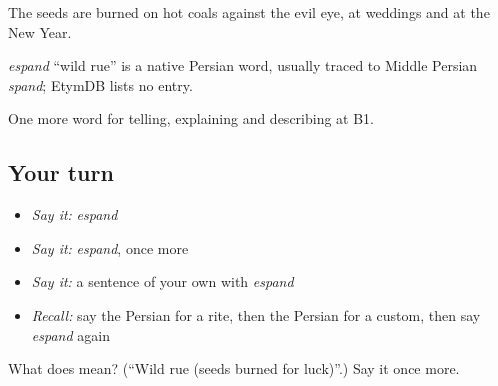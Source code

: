 The seeds are burned on hot coals against the evil eye, at weddings and at the New Year.

\begin{cousinweb}
\emph{espand} \textquotedblleft{}wild rue\textquotedblright{} is a native Persian word, usually traced to Middle Persian \emph{spand}; EtymDB lists no entry.
\end{cousinweb}

\begin{grammarlens}[title={What you've built}]
One more word for telling, explaining and describing at B1.
\end{grammarlens}

\subsection*{Your turn}
\begin{itemize}
\raggedright
  \item \emph{Say it:} \emph{espand}
  \item \emph{Say it:} \emph{espand}, once more
  \item \emph{Say it:} a sentence of your own with \emph{espand}
  \item \emph{Recall:} say the Persian for a rite, then the Persian for a custom, then say \emph{espand} again
\end{itemize}

\begin{tcolorbox}[breakable,colback=teal!4,colframe=teal!35!black,title={Before you move on}]
What does  mean? (\textquotedblleft{}Wild rue (seeds burned for luck)\textquotedblright{}.) Say it once more.
\end{tcolorbox}
